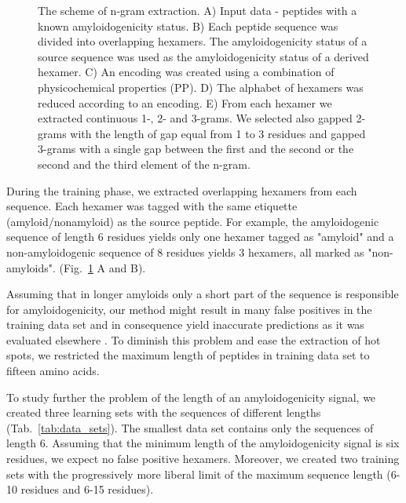 \documentclass[a4,center,fleqn]{NAR}
\begin{document}
\begin{figure}[!tpb]
  \caption{The scheme of n-gram extraction. A) Input data - peptides with a 
known amyloidogenicity status. B) Each peptide sequence was divided into 
overlapping hexamers. The amyloidogenicity status of a source sequence was used 
as the amyloidogenicity status of a derived hexamer. C) An encoding was created 
using a combination of physicochemical properties (PP). D) The alphabet of 
hexamers was reduced according to an encoding. E) From each hexamer we 
extracted continuous 1-, 2- and 3-grams. We selected also gapped 2-grams with 
the length of gap equal from 1 to 3 residues and gapped 3-grams with a single 
gap between the first and the second or the second and the third element of the 
n-gram.}\label{fig:ngram_scheme}
\end{figure}

  During the training phase, we extracted overlapping hexamers from each 
sequence. Each hexamer was tagged with the same etiquette (amyloid/nonamyloid) 
as the source peptide. For example, the amyloidogenic sequence of length 6 
residues yields only one hexamer tagged as "amyloid" and a non-amyloidogenic 
sequence of 8 residues yields 3 hexamers, all marked as "non-amyloids". 
(Fig.~\ref{fig:ngram_scheme} A and B). 

  Assuming that in longer amyloids only a short part of the sequence is 
responsible for amyloidogenicity, our method might result in many false 
positives in the training data set and in consequence yield inaccurate 
predictions as it was evaluated elsewhere \citep{kotulska_amyloid_2013}. To 
diminish this problem and ease the extraction of hot spots, we restricted the 
maximum length of peptides in training data set to fifteen amino acids.

  To study further the problem of the length of an amyloidogenicity signal, we 
created three learning sets with the sequences of different lengths 
(Tab.~\ref{tab:data_sets}). The smallest data set contains only the 
sequences of length 6. Assuming that the minimum length of the amyloidogenicity 
signal is six residues, we expect no false positive hexamers. Moreover, we 
created two training sets with the progressively more liberal limit of the 
maximum sequence length (6-10 residues and 6-15 residues).
\end{document}
